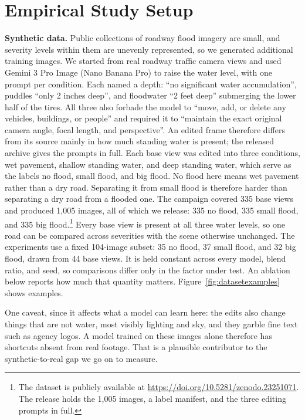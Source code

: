 \documentclass[conference]{IEEEtran}
\begin{document}
\section{Empirical Study Setup}
\label{sec:setup}

\textbf{Synthetic data.} Public collections of roadway flood imagery are small, and severity levels within them are unevenly represented, so we generated additional training images. We started from real roadway traffic camera views and used Gemini 3 Pro Image (Nano Banana Pro) to raise the water level, with one prompt per condition. Each named a depth: ``no significant water accumulation'', puddles ``only 2 inches deep'', and floodwater ``2 feet deep'' submerging the lower half of the tires. All three also forbade the model to ``move, add, or delete any vehicles, buildings, or people'' and required it to ``maintain the exact original camera angle, focal length, and perspective''. An edited frame therefore differs from its source mainly in how much standing water is present; the released archive gives the prompts in full. Each base view was edited into three conditions, wet pavement, shallow standing water, and deep standing water, which serve as the labels no flood, small flood, and big flood. No flood here means wet pavement rather than a dry road. Separating it from small flood is therefore harder than separating a dry road from a flooded one. The campaign covered 335 base views and produced 1{,}005 images, all of which we release: 335 no flood, 335 small flood, and 335 big flood.\footnote{The dataset is publicly available at \url{https://doi.org/10.5281/zenodo.23251071}. The release holds the 1{,}005 images, a label manifest, and the three editing prompts in full.} Every base view is present at all three water levels, so one road can be compared across severities with the scene otherwise unchanged. The experiments use a fixed 104-image subset: 35 no flood, 37 small flood, and 32 big flood, drawn from 44 base views. It is held constant across every model, blend ratio, and seed, so comparisons differ only in the factor under test. An ablation below reports how much that quantity matters. Figure~\ref{fig:datasetexamples} shows examples.

One caveat, since it affects what a model can learn here: the edits also change things that are not water, most visibly lighting and sky, and they garble fine text such as agency logos. A model trained on these images alone therefore has shortcuts absent from real footage. That is a plausible contributor to the synthetic-to-real gap we go on to measure.
\end{document}
